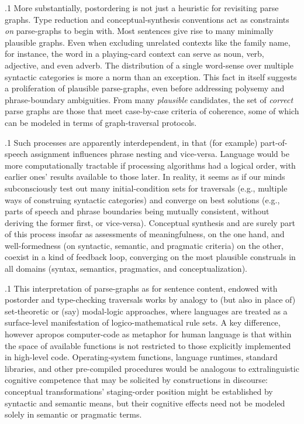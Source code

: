 \documentclass[11pt, twocolumn]{article}
\begin{document}
{{\p.1{%
More substantially, postordering is not just a heuristic
for revisiting parse graphs. Type reduction and
conceptual-synthesis conventions act as constraints
\textit{on} parse-graphs to begin with. Most sentences give rise
to many minimally plausible graphs. Even when excluding
unrelated contexts like the family name, for instance, the
word  in a playing-card context can serve as noun,
verb, adjective, and even adverb. The distribution of a
single word-sense over multiple syntactic categories is more a
norm than an exception. This fact in itself suggests a proliferation
of plausible parse-graphs, even before addressing polysemy and
phrase-boundary ambiguities. From many \textit{plausible} candidates,
the set of \textit{correct} parse graphs are those that meet
case-by-case criteria of coherence, some of which can be modeled in terms
of graph-traversal protocols.
}%

\p.1{%
Such processes are apparently interdependent, in that (for example)
part-of-speech assignment influences phrase nesting and vice-versa.
Language would be more computationally tractable if processing algorithms
had a logical order, with earlier ones'
results available to those later. In reality,
it seems as if our minds subconsciously test out many
initial-condition sets for traversals (e.g., multiple ways
of construing syntactic categories) and converge on best solutions
(e.g., parts of speech and phrase boundaries
being mutually consistent, without deriving the former first,
or vice-versa). Conceptual synthesis and  are
surely part of this process insofar as assessments of meaningfulness, on the
one hand, and well-formedness (on syntactic, semantic, and pragmatic criteria)
on the other, coexist in a kind of feedback loop, converging on the most plausible
construals in all domains (syntax, semantics, pragmatics, and conceptualization).
}%

\p.1{%
This interpretation of parse-graphs \mdash{} as
 for sentence content,
endowed with post\-order and type-checking traversals
 \mdash{} works by analogy to
(but also in place of) set-theoretic or (say) modal-logic
approaches, where languages are treated as a surface-level
manifestation of logico-mathematical rule sets. A key difference,
however \mdash{} apropos computer-code as metaphor for human
language \mdash{} is that within  the space
of available functions is not restricted to those explicitly
implemented in high-level code. Operating-system functions,
language runtimes, standard libraries, and other
pre-compiled procedures would be analogous to extralinguistic
cognitive competence that may be solicited by constructions
in discourse: conceptual transformations' staging-order position
might be established by syntactic and
semantic means, but their cognitive effects need not be
modeled solely in semantic or pragmatic terms.
}%

}}
\end{document}
